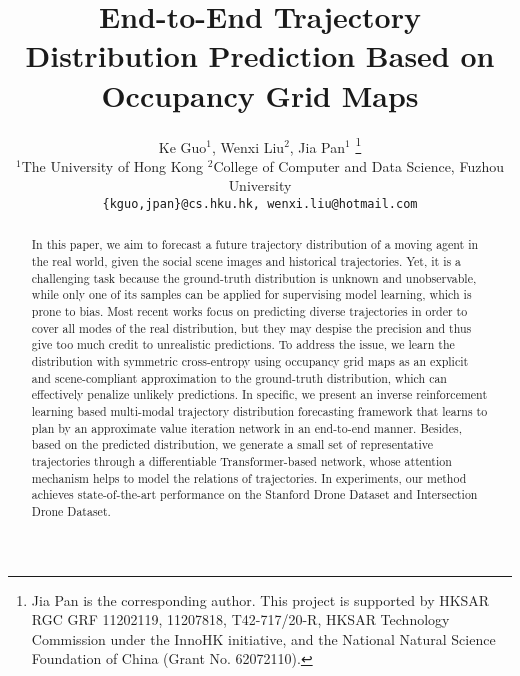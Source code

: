 \documentclass[10pt,twocolumn,letterpaper]{article}
\begin{document}
\title{End-to-End Trajectory Distribution Prediction Based on Occupancy Grid Maps}

\author{Ke Guo$^{1}$, Wenxi Liu$^{2}$, Jia Pan$^{1}$ 
\thanks{Jia Pan is the corresponding author. This project is supported by HKSAR RGC GRF 11202119, 11207818, T42-717/20-R, HKSAR Technology Commission under the InnoHK initiative, and the National Natural Science Foundation of China (Grant No. 62072110).}\\
$^1$The University of Hong Kong \quad $^2$College of Computer and Data Science, Fuzhou University\\
{\tt\small \{kguo,jpan\}@cs.hku.hk, wenxi.liu@hotmail.com}
}
\maketitle

\begin{abstract}
In this paper, we aim to forecast a future trajectory distribution of a moving agent in the real world, given the social scene images and historical trajectories. Yet, it is a challenging task because the ground-truth distribution is unknown and unobservable, while only one of its samples can be applied for supervising model learning, which is prone to bias. Most recent works focus on predicting diverse trajectories in order to cover all modes of the real distribution, but they may despise the precision and thus give too much credit to unrealistic predictions. To address the issue, we learn the distribution with symmetric cross-entropy using occupancy grid maps as an explicit and scene-compliant approximation to the ground-truth distribution, which can effectively penalize unlikely predictions. In specific, we present an inverse reinforcement learning based multi-modal trajectory distribution forecasting framework that learns to plan by an approximate value iteration network in an end-to-end manner. Besides, based on the predicted distribution, we generate a small set of representative trajectories through a differentiable Transformer-based network, whose attention mechanism helps to model the relations of trajectories. In experiments, our method achieves state-of-the-art performance on the Stanford Drone Dataset and Intersection Drone Dataset. 

\end{abstract}
\end{document}
